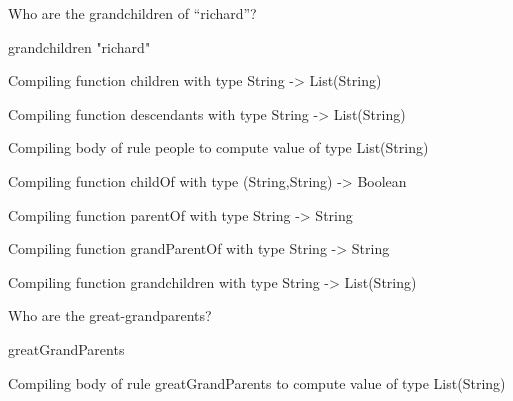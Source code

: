 \begin{xtc}
\begin{xtccomment}
Who are the grandchildren of ``richard''?
\end{xtccomment}
\begin{spadsrc}
grandchildren "richard"
\end{spadsrc}
\begin{MessageOutput}
   Compiling function children with type String -> List(String) 
\end{MessageOutput}
\begin{MessageOutput}
   Compiling function descendants with type String -> List(String) 
\end{MessageOutput}
\begin{MessageOutput}
   Compiling body of rule people to compute value of type List(String) 
\end{MessageOutput}
\begin{MessageOutput}
   Compiling function childOf with type (String,String) -> Boolean 
\end{MessageOutput}
\begin{MessageOutput}
   Compiling function parentOf with type String -> String 
\end{MessageOutput}
\begin{MessageOutput}
   Compiling function grandParentOf with type String -> String 
\end{MessageOutput}
\begin{MessageOutput}
   Compiling function grandchildren with type String -> List(String) 
\end{MessageOutput}
\begin{TeXOutput}
\begin{fricasmath}{12}
%
\end{fricasmath}
\end{TeXOutput}
\end{xtc}
\begin{xtc}
\begin{xtccomment}
Who are the great-grandparents?
\end{xtccomment}
\begin{spadsrc}
greatGrandParents
\end{spadsrc}
\begin{MessageOutput}
   Compiling body of rule greatGrandParents to compute value of type 
      List(String) 
\end{MessageOutput}
\begin{TeXOutput}
\begin{fricasmath}{13}
%
\end{fricasmath}
\end{TeXOutput}
\end{xtc}

